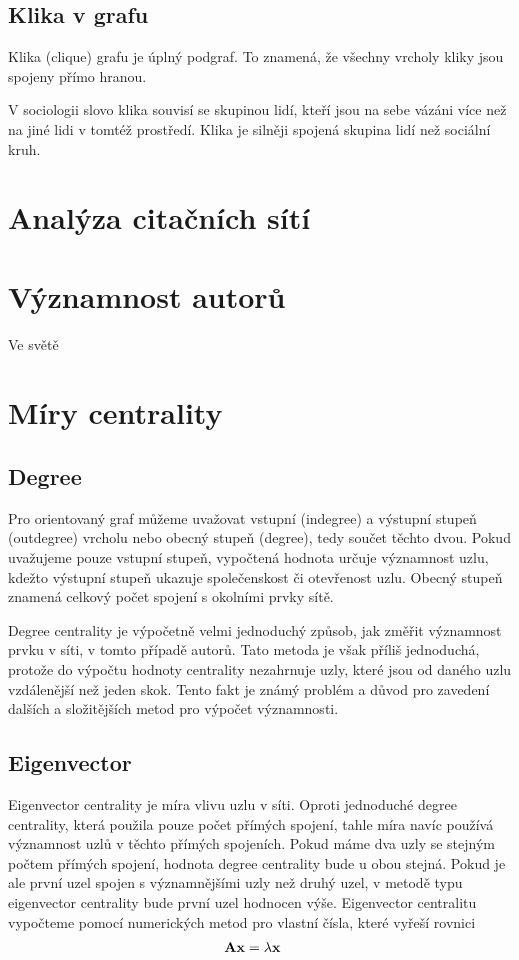 \documentclass[12pt,titlepage]{report}
\begin{document}
\subsection{Klika v grafu}
Klika (clique) grafu je úplný podgraf. To znamená, že všechny vrcholy kliky
jsou spojeny přímo hranou.

V sociologii slovo klika souvisí se skupinou lidí, kteří jsou na sebe vázáni
více než na jiné lidi v tomtéž prostředí. Klika je silněji spojená skupina lidí
než sociální kruh.

\section{Analýza citačních sítí}
\section{Významnost autorů}
Ve světě

\section{Míry centrality}
\subsection{Degree}
Pro orientovaný graf můžeme uvažovat vstupní (indegree) a výstupní stupeň
(outdegree) vrcholu nebo obecný stupeň (degree), tedy součet těchto dvou. Pokud
uvažujeme pouze vstupní stupeň, vypočtená hodnota určuje významnost uzlu,
kdežto výstupní stupeň ukazuje společenskost či otevřenost uzlu. Obecný stupeň
znamená celkový počet spojení s okolními prvky sítě.

Degree centrality je výpočetně velmi jednoduchý způsob, jak změřit významnost
prvku v síti, v tomto případě autorů. Tato metoda je však příliš jednoduchá,
protože do výpočtu hodnoty centrality nezahrnuje uzly, které jsou od daného
uzlu vzdálenější než jeden skok. Tento fakt je známý problém a důvod pro
zavedení dalších a složitějších metod pro výpočet významnosti.

\subsection{Eigenvector}
Eigenvector centrality je míra vlivu uzlu v síti. Oproti jednoduché degree
centrality, která použila pouze počet přímých spojení, tahle míra navíc používá
významnost uzlů v těchto přímých spojeních. Pokud máme dva uzly se stejným
počtem přímých spojení, hodnota degree centrality bude u obou stejná. Pokud je
ale první uzel spojen s významnějšími uzly než druhý uzel, v metodě typu
eigenvector centrality bude první uzel hodnocen výše. Eigenvector centralitu
vypočteme pomocí numerických metod pro vlastní čísla, které vyřeší rovnici 
\begin{align}
{\bf Ax} &= \lambda {\bf x}
\end{align}
\end{document}
